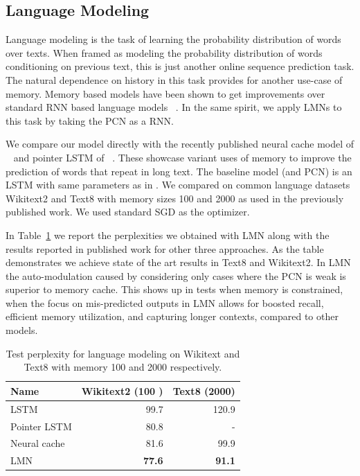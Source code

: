 \documentclass[letterpaper]{article} %
\begin{document}
\subsection{Language Modeling}
Language modeling is the task of learning the probability distribution of words over texts. When framed as modeling the probability distribution of words conditioning on previous text, this is just another online sequence prediction task. The natural dependence on history in this task provides for another use-case of memory. Memory based models have been shown to get improvements over standard RNN based language models ~\cite{SukhbaatarSWF15,merity2016pointer,grave2016improving}.
In the same spirit, we apply LMNs to this task by taking the PCN as a RNN.

We compare our model directly with the recently published neural cache model of ~\cite{grave2016improving} and pointer LSTM of ~\cite{merity2016pointer}. These showcase variant uses of memory to improve the prediction of words that repeat in long text.  The baseline model (and PCN) is an LSTM with same parameters as in \cite{grave2016improving}.
We compared on common language datasets Wikitext2 and Text8 with memory sizes 100 and 2000 as used in the previously published work. We used standard SGD as the optimizer.

 In Table~\ref{tab-lm} we report the perplexities we obtained with LMN along with the results reported in published work for other three approaches. As the table demonstrates we achieve state of the art results in Text8 and Wikitext2. In LMN the auto-modulation caused by considering only cases where the PCN is weak is superior to memory cache. This shows up in tests when memory is constrained, when the focus on mis-predicted outputs in LMN allows for boosted recall, efficient memory utilization, and capturing longer contexts, compared to other models.

\begin{table}
\begin{center}
\begin{tabular}{|l|r|r|} \hline
Name &    Wikitext2 (100 ) &  Text8 (2000)\\ \hline
LSTM & 99.7 & 120.9 \\
Pointer LSTM &	80.8	& -\\
Neural cache &  81.6 &  99.9\\
LMN &	\textbf{77.6}	& \textbf{91.1}\\ \hline
\end{tabular}
\end{center}
\caption{ \label{tab-lm} Test perplexity for language modeling on Wikitext and Text8 with memory 100 and 2000 respectively.}
\end{table}
\end{document}
